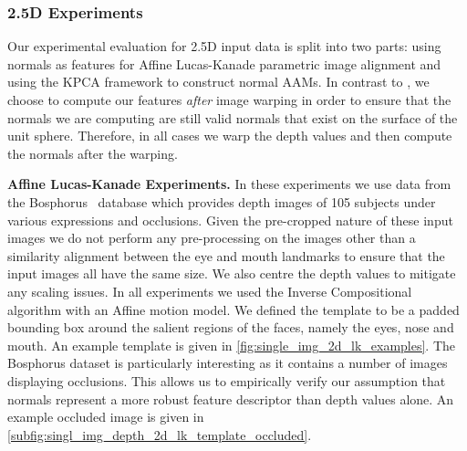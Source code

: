 \subsubsection{2.5D Experiments}\label{subsubsec:singl_img_2d_lk_experiments}
Our experimental evaluation for 2.5D input data is split into two parts: using
normals as features for Affine Lucas-Kanade parametric image alignment and
using the KPCA framework to construct normal AAMs. In contrast to
\citet{antonakos2015feature}, we choose to compute our features \textit{after}
image warping in order to ensure that the normals we are computing are still
valid normals that exist on the surface of the unit sphere. Therefore, in all
cases we warp the depth values and then compute the normals after the
warping.

\textbf{Affine Lucas-Kanade Experiments.} In these experiments we use data
from the Bosphorus~\cite{Savran:2008gg} database which provides depth images
of 105 subjects under various expressions and occlusions. Given the pre-cropped
nature of these input images we do not perform any pre-processing on the
images other than a similarity alignment between the eye and mouth landmarks to
ensure that the input images all have the same size. We also centre the depth
values to mitigate any scaling issues. In all experiments we used the
Inverse Compositional algorithm with an Affine motion model.
We defined the template to be a padded
bounding box around the salient regions of the faces, namely the eyes, nose and
mouth. An example template is given in \cref{fig:single_img_2d_lk_examples}.
The Bosphorus dataset is particularly interesting as it contains a number of
images displaying occlusions. This allows us to empirically verify our assumption
that normals represent a more robust feature descriptor than depth values alone.
An example occluded image is given in
\cref{subfig:singl_img_depth_2d_lk_template_occluded}.

